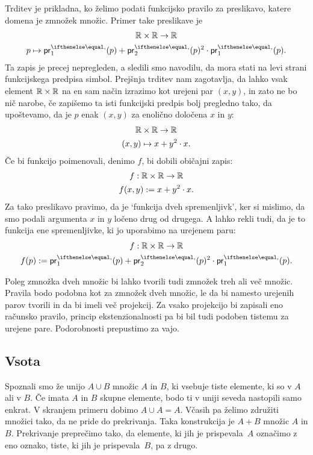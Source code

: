 Trditev je prikladna, ko želimo podati funkcijsko pravilo za preslikavo, katere domena je
zmnožek množic. Primer take preslikave je
%
\begin{gather*}
  \RR \times \RR \to \RR \\
  p \mapsto \fst(p) + \snd(p)^2 \cdot \fst(p).
\end{gather*}
%
Ta zapis je precej nepregleden, a sledili smo navodilu, da mora stati na levi strani
funkcijskega predpisa simbol. Prejšnja trditev nam zagotavlja, da lahko vsak element
$\mathbb{R} \times \mathbb{R}$ na en sam način izrazimo kot urejeni par $(x, y)$, in zato ne bo nič
narobe, če zapišemo ta isti funkcijski predpis bolj pregledno tako, da upoštevamo, da
je $p$ enak $(x, y)$ za enolično določena $x$ in $y$:
%
\begin{gather*}
  \mathbb{R} \times \mathbb{R} \to \mathbb{R} \\
  (x, y) \mapsto x + y^2 \cdot x.
\end{gather*}
%
Če bi funkcijo poimenovali, denimo $f$, bi dobili običajni zapis:
%
\begin{gather*}
  f : \mathbb{R} \times \mathbb{R} \to \mathbb{R} \\
  f(x, y) \mathrel{{:}{=}} x + y^2 \cdot x.
\end{gather*}
%
Za tako preslikavo pravimo, da je `funkcija dveh spremenljivk', ker si mislimo, da smo
podali argumenta $x$ in $y$ ločeno drug od drugega. A lahko rekli tudi, da je to funkcija
ene spremenljivke, ki jo uporabimo na urejenem paru:
%
\begin{gather*}
  f : \RR \times \RR \to \RR \\
  f(p) \dfeq \fst(p) + \snd(p)^2 \cdot \fst(p).
\end{gather*}


Poleg zmnožka dveh množic bi lahko tvorili tudi zmnožek treh ali več množic. Pravila bodo
podobna kot za zmnožek dveh množic, le da bi namesto urejenih parov tvorili  in da bi imeli več projekcij. Za vsako projekcijo bi zapisali eno računsko
pravilo, princip ekstenzionalnosti pa bi bil tudi podoben tistemu za urejene pare.
Podorobnosti prepustimo za vajo.


\subsection{Vsota}
\label{sec:vsota}

Spoznali smo že unijo $A \cup B$ množic $A$ in $B$, ki vsebuje tiste elemente, ki so v $A$
ali v $B$. Če imata $A$ in $B$ skupne elemente, bodo ti v uniji seveda nastopili samo
enkrat. V skranjem primeru dobimo $A \cup A = A$. Včasih pa želimo združiti množici tako,
da ne pride do prekrivanja. Taka konstrukcija je  $A + B$ množic $A$ in $B$.
Prekrivanje preprečimo tako, da elemente, ki jih je prispevala~$A$ označimo z eno oznako,
tiste, ki jih je prispevala~$B$, pa z drugo.

